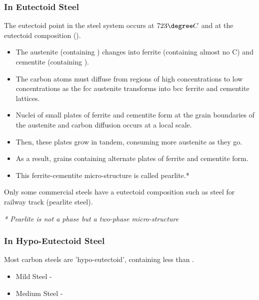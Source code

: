 
\subsubsection{In Eutectoid Steel} %
\label{ssub:in_eutectoid_steel}

The eutectoid point in the steel system occurs at $723\degree C$ and at the eutectoid composition ().
\begin{itemize}
  \item The austenite (containing )  changes into ferrite (containing almost no C) and cementite (containing ).
  \item The carbon atoms must diffuse from regions of high concentrations to low concentrations as the fcc austenite transforms into bcc ferrite and cementite lattices.
  \item Nuclei of small plates of ferrite and cementite form at the grain boundaries of the austenite and carbon diffusion occurs at a local scale.
  \item Then, these plates grow in tandem, consuming more austenite as they go.
  \item As a result, grains containing alternate plates of ferrite and cementite form.
  \item This ferrite-cementite micro-structure is called pearlite.*
\end{itemize}

Only some commercial steels have a eutectoid composition such as steel for railway track (pearlite steel).

\emph{* Pearlite is not a phase but a two-phase micro-structure}




\subsubsection{In Hypo-Eutectoid Steel} %
\label{ssub:in_hypo_eutectoid_steel}

Most carbon steels are 'hypo-eutectoid', containing less than . 
\begin{itemize}
  \item Mild Steel - 
  \item Medium Steel - 
\end{itemize}

